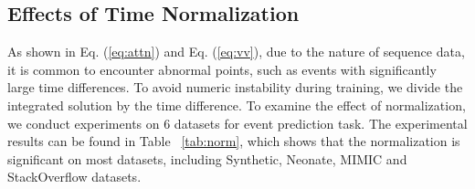 \subsection{Effects of Time Normalization}

As shown in Eq. (\ref{eq:attn}) and Eq. (\ref{eq:vv}), due to the nature of sequence data, it is common to encounter abnormal points, such as events with significantly large time differences. To avoid numeric instability during training, we divide the integrated solution by the time difference. To examine the effect of normalization, we conduct experiments on 6 datasets for event prediction task. The experimental results can be found in Table ~\ref{tab:norm}, which shows that the normalization is significant on most datasets, including Synthetic, Neonate, MIMIC and StackOverflow datasets.


